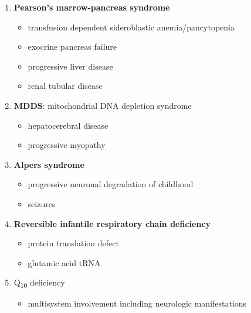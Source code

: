 \documentclass{scrartcl}
\begin{document}
\begin{enumerate}
\begin{enumerate}
\item \textbf{Pearson's marrow-pancreas syndrome}
\label{sec:org1f362d9}
\begin{itemize}
\item transfusion dependent sideroblastic anemia/pancytopenia
\item exocrine pancreas failure
\item progressive liver disease
\item renal tubular disease
\end{itemize}
\item \textbf{MDDS}: mitochondrial DNA depletion syndrome
\label{sec:org1f9b1dd}
\begin{itemize}
\item hepatocerebral disease
\item progressive myopathy
\end{itemize}
\item \textbf{Alpers syndrome}
\label{sec:org9634713}
\begin{itemize}
\item progressive neuronal degradation of childhood
\item seizures
\end{itemize}
\item \textbf{Reversible infantile respiratory chain deficiency}
\label{sec:orge4bbe11}
\begin{itemize}
\item protein translation defect
\item glutamic acid tRNA
\end{itemize}
\item Q\textsubscript{10} deficiency
\label{sec:org4e06d38}
\begin{itemize}
\item multisystem involvement including neurologic manifestations

\end{itemize}
\end{enumerate}
\end{enumerate}
\end{document}
